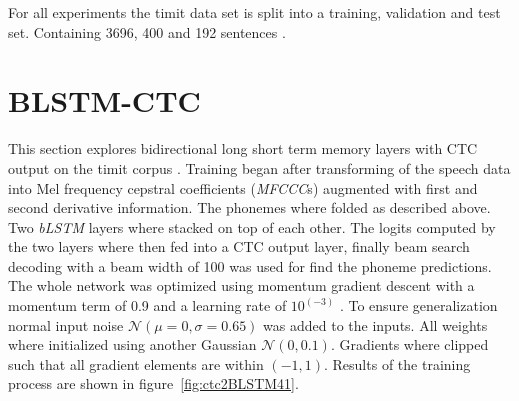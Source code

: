 For all experiments the timit data set is split into a training, validation and test set. Containing 3696, 400 and 192 sentences \cite[page  80]{Graves2012}.  


\section{BLSTM-CTC}
This section explores bidirectional long short term memory layers with CTC output on the timit corpus \cite{Graves2012, Graves2006}. Training began after transforming of the speech data into Mel frequency cepstral coefficients (\textit{MFCCC}s) augmented with first and second derivative information. The phonemes where folded as described above. Two \textit{bLSTM} layers where stacked on top of each other. The logits computed by the two layers where then fed into a CTC  output layer, finally beam search decoding with a beam width of 100 was used for find the phoneme predictions. The whole network was optimized using momentum gradient descent with a momentum term of 0.9 \cite[page 78]{Graves2012} and a learning rate of $10^(-3)$ . To ensure generalization normal input noise $\mathcal{N}(\mu = 0,\sigma = 0.65)$ was added to the inputs. All weights where initialized using another Gaussian $\mathcal{N}(0,0.1)$. Gradients where clipped such that all gradient elements are within $(-1,1)$.
%
Results of the training process are shown in figure~\ref*{fig:ctc2BLSTM41}. 

